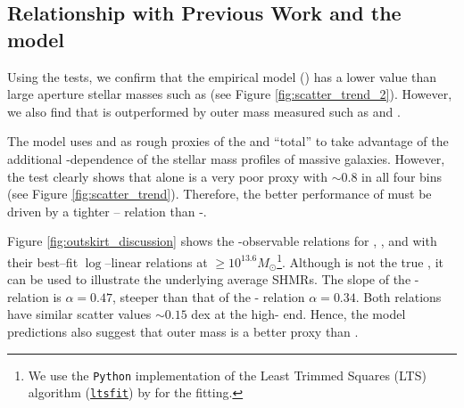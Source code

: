 \documentclass[fleqn,usenatbib,useAMS]{mnras}
\begin{document}
\begin{CJK*}{UTF8}{gbsn}
\subsection{Relationship with Previous Work and the \asap{} model}
    \label{sec:asap_discussion}
    
    Using the \topn{} tests, we confirm that the \asap{} empirical model (\citealt{Huang2020}) has a
    lower \sigmvir{} value than large aperture stellar masses such as  (see Figure
    \ref{fig:scatter_trend_2}). 
    However, we also find that \asap{} is outperformed by outer mass measured such as
     and .

    The \asap{} model uses  and  as rough proxies of the \insitu{} and
    ``total'' \mstar{} to take advantage of the additional \mvir{}-dependence of the stellar mass
    profiles of massive galaxies.
    However, the \topn{} test clearly shows that  alone is a very poor \mvir{} proxy with
    \sigmvir{}$\sim 0.8$ in all four bins (see Figure \ref{fig:scatter_trend}).
    Therefore, the better performance of \masap{} must be driven by a tighter 
    \mvir{}-- relation than  \mvir{}-.
    
    Figure \ref{fig:outskirt_discussion} shows the \masap{}-observable relations for ,
    , and  with their best--fit $\log$--linear relations at
    \masap$\geq 10^{13.6} M_{\odot}$\footnote{We use the \texttt{Python} implementation of the Least
    Trimmed Squares (LTS) algorithm (\href{https://pypi.org/project/ltsfit/}{\texttt{ltsfit}}) by
    \citet{Cappellari13b} for the fitting.}.
    Although \masap{} is not the true \mvir{}, it can be used to illustrate the underlying average
    SHMRs.
    The slope of the \masap{}- relation is $\alpha = 0.47$, steeper than that of the
    \masap{}- relation $\alpha = 0.34$.
    Both relations have similar scatter values \sigms$\sim 0.15$ dex at the high-\masap{} end. 
    Hence, the \asap{} model predictions also suggest that outer mass  is a better
    \mvir{} proxy than .


\end{CJK*}
\end{document}
